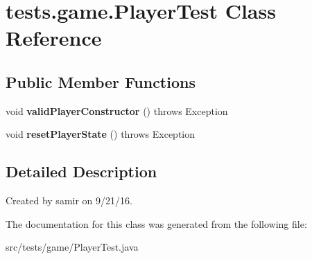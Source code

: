 \hypertarget{classtests_1_1game_1_1_player_test}{}\section{tests.\+game.\+Player\+Test Class Reference}
\label{classtests_1_1game_1_1_player_test}
\subsection*{Public Member Functions}
\begin{DoxyCompactItemize}
\item 
\hypertarget{classtests_1_1game_1_1_player_test_a94606fac06d2cd22b1c945ae5b0b6bdb}{}\label{classtests_1_1game_1_1_player_test_a94606fac06d2cd22b1c945ae5b0b6bdb} 
void {\bfseries valid\+Player\+Constructor} ()  throws Exception 
\item 
\hypertarget{classtests_1_1game_1_1_player_test_a214a608d362d72b11ea55eb86af41718}{}\label{classtests_1_1game_1_1_player_test_a214a608d362d72b11ea55eb86af41718} 
void {\bfseries reset\+Player\+State} ()  throws Exception 
\end{DoxyCompactItemize}


\subsection{Detailed Description}
Created by samir on 9/21/16. 

The documentation for this class was generated from the following file\+:\begin{DoxyCompactItemize}
\item 
src/tests/game/Player\+Test.\+java\end{DoxyCompactItemize}
